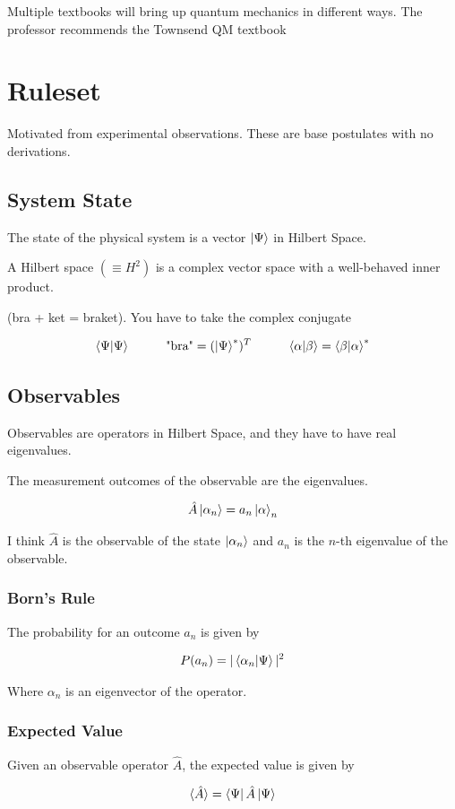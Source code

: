\documentclass[fleqn]{report}
\newcommand{\hp}{\hspace{1cm}}
\newcommand{\equations} [1] {
\begin{gather*}
#1
\end{gather*}
}
\begin{document}
Multiple textbooks will bring up quantum mechanics in different ways. 
The professor recommends the Townsend QM textbook 

\chapter{Ruleset}
Motivated from experimental observations. These are base postulates 
with no derivations. 

\section{System State}
The state of the physical system is a vector $\ket \Psi$ 
in Hilbert Space. 

A Hilbert space $(\equiv H^2)$ is a complex vector space with a well-behaved 
inner product.

(bra + ket = braket). You have to take the complex conjugate
\equations{
    \bra \Psi \ket{\Psi}
    \hp 
    \textrm{"bra"}
    =
    (\ket{\Psi}^*)^T
    \hp 
    \bra \alpha \ket{\beta}
    =
    \bra \beta \ket{\alpha}^*
}

\section{Observables}
Observables are operators in Hilbert Space, and they have to 
have real eigenvalues. 

The measurement outcomes of the observable are the eigenvalues.

\equations{
    \hat A \ket{\alpha_n}
    =
    a_n \ket \alpha_n
}

I think $\hat A$ is the observable of the state $\ket{\alpha_n}$ 
and $a_n$ is the $n$-th eigenvalue of the observable.

\subsection{Born's Rule}

The probability for an outcome $a_n$ is given by 
\equations{
    P(a_n)
    =
    |\bra{\alpha_n} \ket{\Psi}|^2
}
Where $\alpha_n$ is an eigenvector of the operator. 

\subsection{Expected Value}
Given an observable operator $\hat A$, the expected value is given by 

\equations{
    \langle \hat A \rangle 
    =
    \bra{\Psi} \hat A \ket{\Psi}
}
\end{document}
